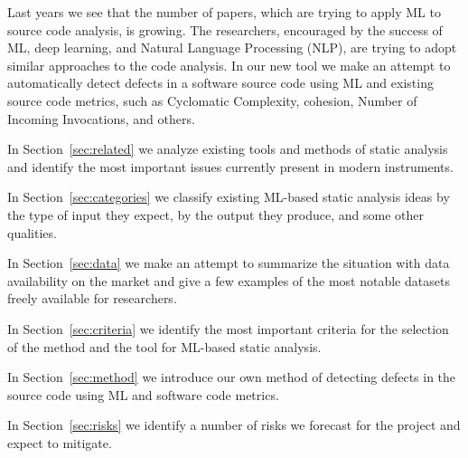 




Last years we see that the number of papers, which are trying to apply ML to source 
code analysis, is growing. The researchers, encouraged by the success 
of ML, deep learning, and Natural Language Processing (NLP), 
are trying to adopt similar approaches to the code analysis.
In our new tool we make an attempt to automatically detect defects
in a software source code using ML and existing source code metrics,
such as Cyclomatic Complexity, cohesion, Number of Incoming Invocations, 
and others.

In Section~\ref{sec:related} we analyze existing tools and methods
of static analysis and identify the most important issues currently
present in modern instruments.

In Section~\ref{sec:categories} we classify existing ML-based
static analysis ideas by the type of input they expect, by the output
they produce, and some other qualities.

In Section~\ref{sec:data} we make an attempt to summarize the situation
with data availability on the market and give a few examples of the
most notable datasets freely available for researchers.

In Section~\ref{sec:criteria} we identify the most important criteria
for the selection of the method and the tool for ML-based static analysis.

In Section~\ref{sec:method} we introduce our own method of detecting
defects in the source code using ML and software code metrics.

In Section~\ref{sec:risks} we identify a number of risks we forecast
for the project and expect to mitigate.